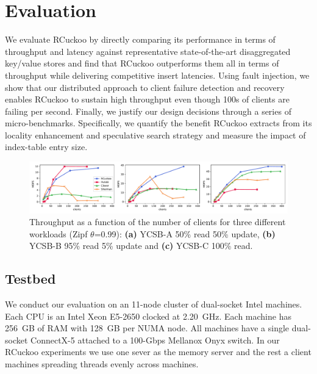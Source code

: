\section{Evaluation}
\label{sec:eval}

We evaluate RCuckoo by directly comparing its performance in terms of
throughput and latency against representative state-of-the-art
disaggregated key/value stores and find that RCuckoo outperforms them
all in terms of throughput while delivering competitive insert
latencies.  Using fault injection, we show that our distributed
approach to client failure detection and recovery enables RCuckoo to
sustain high throughput even though 100s of clients are failing per
second.  Finally, we justify our design decisions through a series of
micro-benchmarks. Specifically, we quantify the benefit RCuckoo
extracts from its locality enhancement and speculative search strategy
and measure the impact of
index-table entry size.



\begin{figure}[ht]
    \includegraphics[width=0.99\linewidth]{fig/hero_ycsb_throughput.pdf}

    \caption{Throughput as a function of the number of clients for three different workloads (Zipf $\theta$=0.99): \textbf{(a)} YCSB-A 50\%
    read 50\% update, \textbf{(b)} YCSB-B 95\% read 5\% update and \textbf{(c)}
    YCSB-C 100\% read.}
    \label{fig:ycsb_throughput}
 \end{figure}


\subsection{Testbed}

We conduct our evaluation on an 11-node cluster of dual-socket Intel
machines. Each CPU is an Intel Xeon E5-2650 clocked at
2.20~GHz. Each machine has 256~GB of RAM with 128~GB per NUMA
node. All machines have a single dual-socket ConnectX-5 attached to a
100-Gbps Mellanox Onyx switch. In our RCuckoo experiments we use one
sever as the memory server and the rest a client machines
spreading threads evenly across machines.


